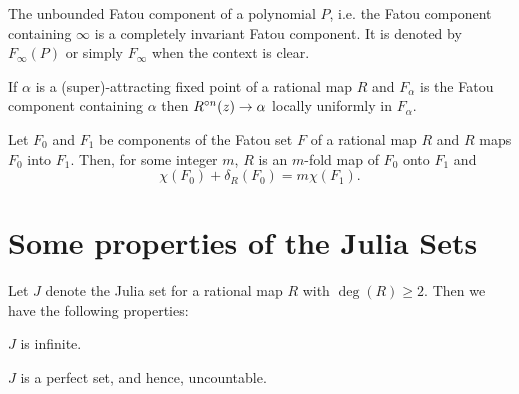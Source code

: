 \begin{theorem}\label{thm1.4}
	The unbounded Fatou component of a polynomial \( P \), i.e. the Fatou component containing \( \infty \)
	is a completely invariant Fatou component. It is denoted by \( F_\infty(P) \) or simply \( F_\infty \) when
	the context is clear.
\end{theorem}

\begin{theorem}

\end{theorem}

\begin{lemma}\label{lem1.2}
	If \( \alpha \) is a (super)-attracting fixed point of a rational map \( R \) and \( F_\alpha \) is the
	Fatou component containing \( \alpha \) then \( \ror[n](z)\to \alpha \)
	locally uniformly in \( F_\alpha \).
\end{lemma}

\begin{theorem}
	Let \( F_0 \) and \( F_1 \) be components of the Fatou set \( F \) of a rational map \( R \)
	and \( R \) maps \( F_0 \) into \( F_1 \). Then, for some integer \( m \), \( R \) is an \( m \)-fold
	map of \( F_0 \) onto \( F_1 \) and \[
		\chi(F_0)+\delta_R(F_0)=m\chi(F_1)
	.\] 
\end{theorem}

\section{Some properties of the Julia Sets}
Let \( J \) denote the Julia set for a rational map \( R \) with \( \deg(R)\ge 2 \). Then we have the following properties:
\begin{theorem} 
	\( J \) is infinite.
\end{theorem}

\begin{theorem}
	
\end{theorem}

\begin{theorem}
	\( J \) is a perfect set, and hence, uncountable.
\end{theorem}
